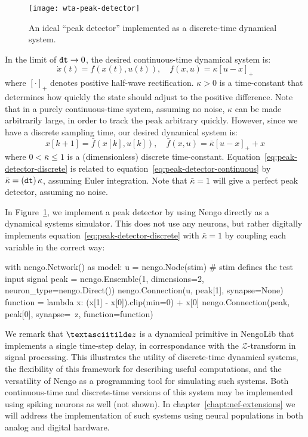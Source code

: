 \begin{figure}
\centering
\texttt{[image: wta-peak-detector]}
\caption{ \label{fig:wta-peak-detector}
  An ideal ``peak detector'' implemented as a discrete-time dynamical system.
}
\end{figure}

In the limit of $\texttt{dt}{} \rightarrow 0$, the desired continuous-time dynamical system is:
\begin{equation}
\label{eq:peak-detector-continuous}
\dot{x}(t) = f(x(t), u(t)), \quad f(x, u) = \kappa \left[u - x \right]_+
\end{equation}
where $\left[ \cdot \right]_+$ denotes positive half-wave rectification. $\kappa > 0$ is a time-constant that determines how quickly the state should adjust to the positive difference. Note that in a purely continuous-time system, assuming no noise, $\kappa$ can be made arbitrarily large, in order to track the peak arbitrary quickly. 
However, since we have a discrete sampling time, our desired dynamical system is:
\begin{equation}
\label{eq:peak-detector-discrete}
x[k + 1] = \bar{f}(x[k], u[k]), \quad \bar{f}(x, u) = \bar{\kappa} \left[u - x \right]_+ + x
\end{equation}
where $0 < \bar{\kappa} \le 1$ is a (dimensionless) discrete time-constant.
Equation~\ref{eq:peak-detector-discrete} is related to equation~\ref{eq:peak-detector-continuous} by $\bar{\kappa} = \left( \texttt{dt}{} \right) \kappa$, assuming Euler integration.
Note that $\bar{\kappa} = 1$ will give a perfect peak detector, assuming no noise.

In Figure~\ref{fig:wta-peak-detector}, we implement a peak detector by using Nengo directly as a dynamical systems simulator. This does not use any neurons, but rather digitally implements equation~\ref{eq:peak-detector-discrete} with $\bar{\kappa} = 1$ by coupling each variable in the correct way:
\begin{python}
with nengo.Network() as model:
    u = nengo.Node(stim)  # stim defines the test input signal
    peak = nengo.Ensemble(1, dimensions=2, neuron_type=nengo.Direct())
    nengo.Connection(u, peak[1], synapse=None)
    function = lambda x: (x[1] - x[0]).clip(min=0) + x[0]
    nengo.Connection(peak, peak[0], synapse=~z, function=function)
\end{python}
We remark that $\textasciitilde z$ is a dynamical primitive in NengoLib that implements a single time-step delay, in correspondance with the $\mathcal{Z}$-transform in signal processing.
This illustrates the utility of discrete-time dynamical systems, the flexibility of this framework for describing useful computations, and the versatility of Nengo as a programming tool for simulating such systems.
Both continuous-time and discrete-time versions of this system may be implemented using spiking neurons as well (not shown).
In chapter~\ref{chapt:nef-extensions} we will address the implementation of such systems using neural populations in both analog and digital hardware.

